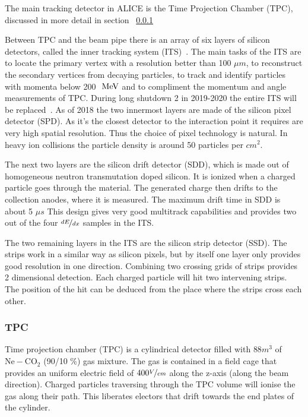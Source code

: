 The main tracking detector in ALICE is the Time Projection Chamber (TPC), discussed in more detail in section ~\ref{sec:TPC}

Between TPC and the beam pipe there is an array of six layers of silicon detectors, called the inner tracking system (ITS)~\cite{ITS}. The main tasks of the ITS are to locate the primary vertex with a resolution better than 100 $\mu m$, to reconstruct the secondary vertices from decaying particles, to track and identify particles with momenta below 200 $\mbox{~MeV}$ and to compliment the momentum and angle measurements of TPC. During long shutdown 2 in 2019-2020 the entire ITS will be replaced~\cite{ITSupgrage}. As of 2018 the two innermost layers are made of the silicon pixel detector (SPD). As it's the closest detector to the interaction point it requires are very high spatial resolution. Thus the choice of pixel technology is natural. In heavy ion collisions the particle density is around 50 particles per $cm^2$. 

The next two layers are the silicon drift detector (SDD), which is made out of homogeneous neutron transmutation doped silicon. It is ionized when a charged particle goes through the material. The generated charge then drifts to the collection anodes, where it is measured. The maximum drift time in SDD is about 5 $\mu s$ This design gives very good multitrack capabilities and provides two out of the four $\nicefrac{dE}{dx}$ samples in the ITS.

The two remaining layers in the ITS are the silicon strip detector (SSD). The strips work in a similar way as silicon pixels, but by itself one layer only provides good resolution in one direction. Combining two crossing grids of strips provides 2 dimensional detection. Each charged particle will hit two intervening strips. The position of the hit can be deduced from the place where the strips cross each other.

\subsubsection{TPC}
\label{sec:TPC}
Time projection chamber (TPC) is a cylindrical detector filled with $ 88 m^3$ of $\mathrm{Ne-CO_2}$ (90/10 \%) gas mixture. The gas is contained in a field cage that provides an uniform electric field of $400 \nicefrac{V}{cm}$ along the z-axis (along the beam direction). Charged particles traversing through the TPC volume will ionise the gas along their path. This liberates electors that drift towards the end plates of the cylinder. 

